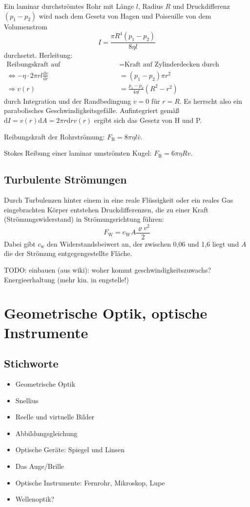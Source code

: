 \documentclass[a4paper]{scrartcl}
\begin{document}
Ein laminar durchströmtes Rohr mit Länge $l$, Radius $R$ und Druckdifferenz $(p_1-p_2)$ wird nach dem Gesetz von Hagen und Poiseuille von dem Volumenstrom
\begin{equation*}
  I = \frac{\pi R^4(p_1-p_2)}{8\eta l}
\end{equation*}
durchsetzt. Herleitung:
\begin{align*}
  \text{Reibungskraft auf Zylinderaußenmantel} &= \text{Kraft auf Zylinderdecken durch Druckdifferenz} \\
  \iff -\eta \cdot 2\pi r l \frac{\text{d}v}{\text{d}r} & = (p_1 - p_2)\pi r^2\\
  \Rightarrow v(r) & = \frac{p_1-p_2}{4\eta l}(R^2-r^2)
\end{align*}
durch Integration und der Randbedingung $v=0$ für $r=R$. Es herrscht also ein parabolisches Geschwindigkeitsgefälle. Aufintegriert gemäß $\text{d}I = v(r) \text{d}A = 2\pi r \text{d}r v(r)$ ergibt sich das Gesetz von H und P.

Reibungskraft der Rohrströmung: $F_\text{R} = 8\pi \eta l \bar v$.

Stokes Reibung einer laminar umströmten Kugel: $F_\text{R} = 6\pi \eta R v$.

\subsection{Turbulente Strömungen}
Durch Turbulenzen hinter einem in eine reale Flüssigkeit oder ein reales Gas eingebrachten Körper entstehen Druckdifferenzen, die zu einer Kraft (Strömungswiderstand) in Strömungsrichtung führen:
\begin{equation*}
  F_\text{W} = c_\text{W}A\frac{\varrho v^2}{2}
\end{equation*}
Dabei gibt $c_\text{w}$ den Widerstandsbeiwert an, der zwischen 0,06 und 1,6 liegt und $A$ die der Strömung entgegengestellte Fläche.

TODO: einbauen (aus wiki): woher kommt geschwindigkeitszuwachs? Energieerhaltung (mehr kin. in engstelle!)

\section{Geometrische Optik, optische Instrumente}

\subsection{Stichworte}
\begin{itemize}[noitemsep]
  \item Geometrische Optik
  \item Snellius
  \item Reelle und virtuelle Bilder
  \item Abbildungsgleichung
  \item Optische Geräte: Spiegel und Linsen
  \item Das Auge/Brille
  \item Optische Instrumente: Fernrohr, Mikroskop, Lupe
  \item Wellenoptik?
\end{itemize}
\end{document}
